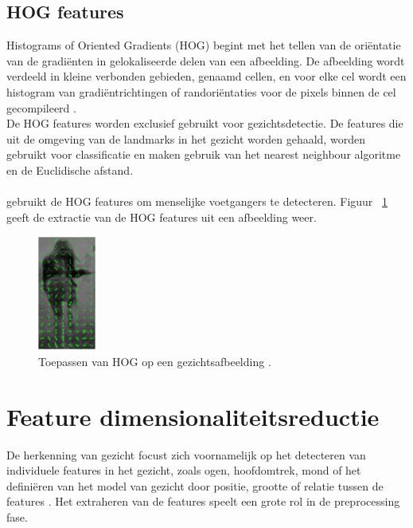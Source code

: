 \subsection{HOG features} \label{sub:hog}
Histograms of Oriented Gradients (HOG) begint met het tellen van de oriëntatie van de gradiënten in gelokaliseerde delen van een afbeelding. De afbeelding wordt verdeeld in kleine verbonden gebieden, genaamd cellen, en voor elke cel wordt een
histogram van gradiëntrichtingen of randoriëntaties voor de pixels binnen de cel gecompileerd \autocite{Deniz2011}. \\
De HOG features worden exclusief gebruikt voor gezichtsdetectie. De features die uit de omgeving van de landmarks in het gezicht worden gehaald, worden gebruikt voor classificatie en maken gebruik van het nearest neighbour algoritme en de Euclidische afstand. \\
\\
\textcite{Tomasi2015} gebruikt de HOG features om menselijke voetgangers te detecteren. Figuur {~\ref{fig:hog}} geeft de extractie van de HOG features uit een afbeelding weer. 
\begin{figure}
    \centering
    \includegraphics{graphics/hog.PNG}
    \caption[HOG features]{Toepassen van HOG op een gezichtsafbeelding \autocite{Tomasi2015}.
        \label{fig:hog}}
\end{figure}

\section{Feature dimensionaliteitsreductie} \label{sec:featuredimred}
De herkenning van gezicht focust zich voornamelijk op het detecteren van individuele features in het gezicht, zoals ogen, hoofdomtrek, mond of het definiëren van het model van gezicht door positie, grootte of relatie tussen de features \autocite{Lin2006}. Het extraheren van de features speelt een grote rol in de preprocessing fase. \\
\\

